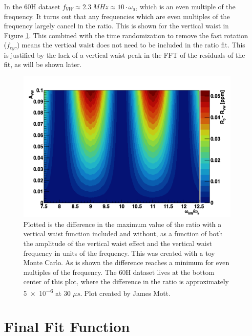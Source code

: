 	In the 60H dataset $f_{VW} \approx \SI{2.3}{MHz} \approx 10 \cdot \omega_{a}$, which is an even multiple of the \gmtwo frequency. It turns out that any frequencies which are even multiples of the \gmtwo frequency largely cancel in the ratio. This is shown for the vertical waist in Figure \ref{fig:VWPlot}. This combined with the time randomization to remove the fast rotation ($f_{cyc}$) means the vertical waist does not need to be included in the ratio fit. This is justified by the lack of a vertical waist peak in the FFT of the residuals of the fit, as will be shown later.

	\begin{figure}[]
		\centering
		\includegraphics[width=\textwidth]{VWPlot}
	    \caption[VWPlot]{Plotted is the difference in the maximum value of the ratio with a vertical waist function included and without, as a function of both the amplitude of the vertical waist effect and the vertical waist frequency in units of the \gmtwo frequency. This was created with a toy Monte Carlo. As is shown the difference reaches a minimum for even multiples of the \gmtwo frequency. The 60H dataset lives at the bottom center of this plot, where the difference in the ratio is approximately \SI{5e-6}{} at 30 $\mu s$. Plot created by James Mott.}
	    \label{fig:VWPlot}
	\end{figure}


\section{Final Fit Function}
\label{Sec:FinalFitFunction}

